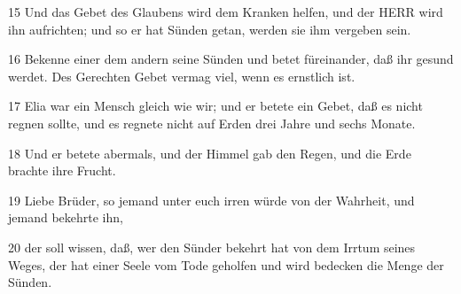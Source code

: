 \par 15 Und das Gebet des Glaubens wird dem Kranken helfen, und der HERR wird ihn aufrichten; und so er hat Sünden getan, werden sie ihm vergeben sein.
\par 16 Bekenne einer dem andern seine Sünden und betet füreinander, daß ihr gesund werdet. Des Gerechten Gebet vermag viel, wenn es ernstlich ist.
\par 17 Elia war ein Mensch gleich wie wir; und er betete ein Gebet, daß es nicht regnen sollte, und es regnete nicht auf Erden drei Jahre und sechs Monate.
\par 18 Und er betete abermals, und der Himmel gab den Regen, und die Erde brachte ihre Frucht.
\par 19 Liebe Brüder, so jemand unter euch irren würde von der Wahrheit, und jemand bekehrte ihn,
\par 20 der soll wissen, daß, wer den Sünder bekehrt hat von dem Irrtum seines Weges, der hat einer Seele vom Tode geholfen und wird bedecken die Menge der Sünden.

